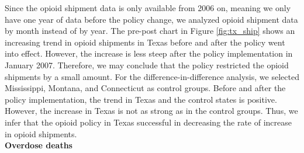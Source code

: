 \documentclass[12pt,letterpaper]{article}
\begin{document}
Since the opioid shipment data is only available from 2006 on, meaning we only have one year of data before the policy change, we analyzed opioid shipment data by month instead of by year. The pre-post chart in Figure \ref{fig:tx_ship} shows an increasing trend in opioid shipments in Texas before and after the policy went into effect. However, the increase is less steep after the policy implementation in January 2007. Therefore, we may conclude that the policy restricted the opioid shipments by a small amount. For the difference-in-difference analysis, we selected Mississippi, Montana, and Connecticut as control groups. Before and after the policy implementation, the trend in Texas and the control states is positive. However, the increase in Texas is not as strong as in the control groups. Thus, we infer that the opioid policy in Texas successful in decreasing the rate of increase in opioid shipments. \\

\noindent \textbf{Overdose deaths}
\end{document}
